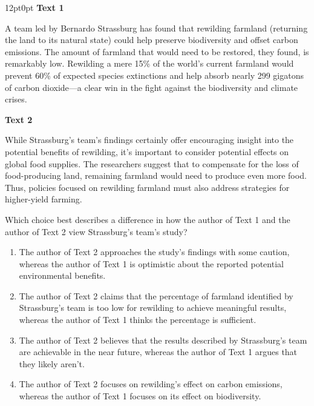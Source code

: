 \documentclass[11pt, twocolumn]{article}
\newcounter{questionnum}
\begin{document}
\vspace{6pt}\noindent
\begin{minipage}{\columnwidth}\raggedright
\noindent{}\par\vspace{8pt}
\begin{adjustwidth}{12pt}{0pt}
\textbf{Text 1}

A team led by Bernardo Strassburg has found that rewilding farmland (returning the land to its natural state) could help preserve biodiversity and offset carbon emissions. The amount of farmland that would need to be restored, they found, is remarkably low. Rewilding a mere 15\% of the world's current farmland would prevent 60\% of expected species extinctions and help absorb nearly 299 gigatons of carbon dioxide---a clear win in the fight against the biodiversity and climate crises.

 

\vspace{8pt}
\textbf{Text 2}

While Strassburg's team's findings certainly offer encouraging insight into the potential benefits of rewilding, it's important to consider potential effects on global food supplies. The researchers suggest that to compensate for the loss of food-producing land, remaining farmland would need to produce even more food. Thus, policies focused on rewilding farmland must also address strategies for higher-yield farming.
\vspace{6pt}

Which choice best describes a difference in how the author of Text 1 and the author of Text 2 view Strassburg's team's study?
\begin{enumerate}[label=\Alph*),leftmargin=18pt,topsep=3pt,itemsep=2pt]
  \item The author of Text 2 approaches the study's findings with some caution, whereas the author of Text 1 is optimistic about the reported potential environmental benefits.
  \item The author of Text 2 claims that the percentage of farmland identified by Strassburg's team is too low for rewilding to achieve meaningful results, whereas the author of Text 1 thinks the percentage is sufficient.
  \item The author of Text 2 believes that the results described by Strassburg's team are achievable in the near future, whereas the author of Text 1 argues that they likely aren't.
  \item The author of Text 2 focuses on rewilding's effect on carbon emissions, whereas the author of Text 1 focuses on its effect on biodiversity.
\end{enumerate}
\end{adjustwidth}
\end{minipage}\par
\end{document}

